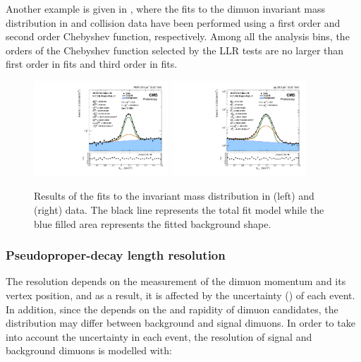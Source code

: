 Another example is given in , where the fits to the dimuon invariant mass distribution in \RunPbPb and \Runpp collision data have been performed using a first order and second order Chebyshev function, respectively. Among all the analysis bins, the orders of the Chebyshev function selected by the LLR tests are no larger than first order in \RunPbPb fits and third order in \Runpp fits.

\begin{figure}[htb!]
 \centering
 \includegraphics[width=0.45\textwidth]{Figures/Charmonia/Analysis/JpsiSignalExtraction/mass/PLOT_MASS_DATA_PbPb_Jpsi_DoubleCrystalBall_pt3045_rap1824_cent0200.pdf}
 \includegraphics[width=0.45\textwidth]{Figures/Charmonia/Analysis/JpsiSignalExtraction/mass/PLOT_MASS_DATA_PP_Jpsi_DoubleCrystalBall_Bkg_Chebychev2_pt4555_rap1824_cent0200.pdf}
\caption{Results of the fits to the \mumu invariant mass distribution in \RunPbPb (left) and \Runpp (right) data. The black line represents the total fit model while the blue filled area represents the fitted background shape.}
 \label{fig:Mass}
\end{figure}

\subsubsection{Pseudoproper-decay length resolution}\label{sec:Charmonia_Analysis_JPsiYieldExtraction_CtauResPar}

The \ctau resolution depends on the measurement of the dimuon momentum and its vertex position, and as a result, it is affected by the \ctau uncertainty (\sigmactau) of each event. In addition, since the \sigmactau depends on the \pt and rapidity of dimuon candidates, the \sigmactau distribution may differ between background and signal dimuons. In order to take into account the \ctau uncertainty in each event, the \ctau resolution of signal and background dimuons is modelled with:

